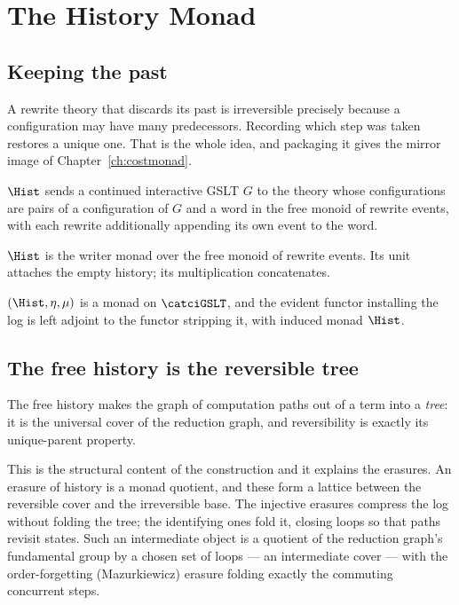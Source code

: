 \chapter{The History Monad}
\label{ch:histmonad}

\section{Keeping the past}

A rewrite theory that discards its past is irreversible precisely because a configuration
may have many predecessors. Recording which step was taken restores a unique one. That is
the whole idea, and packaging it gives the mirror image of Chapter~\ref{ch:costmonad}.

\begin{definition}
$\Hist$ sends a continued interactive GSLT $G$ to the theory whose configurations are
pairs of a configuration of $G$ and a word in the free monoid of rewrite events, with
each rewrite additionally appending its own event to the word.
\end{definition}

$\Hist$ is the writer monad over the free monoid of rewrite events. Its unit attaches
the empty history; its multiplication concatenates.

\begin{proposition}
\label{ob:prop:hist-adjunction}
$(\Hist, \eta, \mu)$ is a monad on $\catciGSLT$, and the evident functor installing the log
is left adjoint to the functor stripping it, with induced monad $\Hist$.
\end{proposition}

\section{The free history is the reversible tree}

\begin{proposition}
\label{ob:prop:univcover}
The free history makes the graph of computation paths out of a term into a \emph{tree}:
it is the universal cover of the reduction graph, and reversibility is exactly its
unique-parent property.
\end{proposition}

This is the structural content of the construction and it explains the erasures. An
erasure of history is a monad quotient, and these form a lattice between the reversible
cover and the irreversible base. The injective erasures compress the log without folding
the tree; the identifying ones fold it, closing loops so that paths revisit states. Such
an intermediate object is a quotient of the reduction graph's fundamental group by a
chosen set of loops --- an intermediate cover --- with the order-forgetting
(Mazurkiewicz) erasure folding exactly the commuting concurrent steps.

